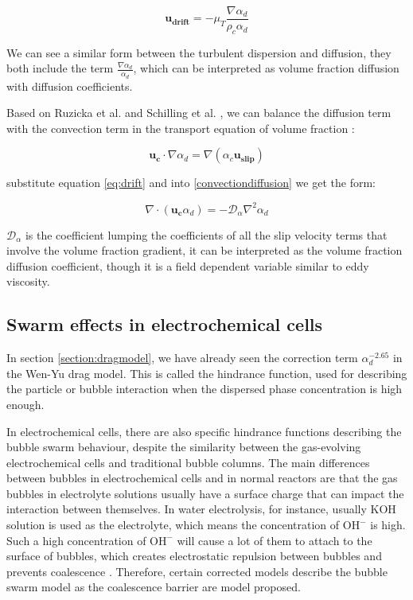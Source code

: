 \begin{equation}\label{eq:drift}
    \mathbf{u_{drift}} = -\mu_T \frac{\nabla \alpha_d}{\rho_c \alpha_d}
\end{equation}

We can see a similar form between the turbulent dispersion and diffusion, they both include the term $\frac{\nabla \alpha_d}{\alpha_d}$, which can be interpreted as volume fraction diffusion with diffusion coefficients.

Based on Ruzicka et al. \cite{Ruzicka2003} and Schilling et al. \cite{Schillings2015}, we can balance the diffusion term with the convection term in the transport equation of volume fraction \cite{Schillings2015}: 

\begin{equation}\label{convectiondiffusion}
     \mathbf{u_c} \cdot \nabla \alpha_d = \nabla(\alpha_c \mathbf{u_{slip}})
\end{equation}

substitute equation \ref{eq:drift} and \label{eq:diffusion} into \ref{convectiondiffusion} we get the form:

\begin{equation}
    \nabla \cdot (\mathbf{u_c} \alpha_d) = -\mathcal{D_{\alpha}} \nabla^2 \alpha_d 
\end{equation}

$\mathcal{D_{\alpha}}$ is the coefficient lumping the coefficients of all the slip velocity terms that involve the volume fraction gradient, it can be interpreted as the volume fraction diffusion coefficient, though it is a field dependent variable similar to eddy viscosity.


\subsection{Swarm effects in electrochemical cells}

In section \ref{section:dragmodel}, we have already seen the correction term $\alpha^{-2.65}_d$ in the Wen-Yu drag model. This is called the hindrance function, used for describing the particle or bubble interaction when the dispersed phase concentration is high enough.

In electrochemical cells, there are also specific hindrance functions describing the bubble swarm behaviour, despite the similarity between the gas-evolving electrochemical cells and traditional bubble columns. The main differences between bubbles in electrochemical cells and in normal reactors are that the gas bubbles in electrolyte solutions usually have a surface charge that can impact the interaction between themselves. In water electrolysis, for instance, usually $\mathrm{KOH}$ solution is used as the electrolyte, which means the concentration of $\mathrm{OH^-}$ is high. Such a high concentration of $\mathrm{OH^-}$ will cause a lot of them to attach to the surface of bubbles, which creates electrostatic repulsion between bubbles and prevents coalescence \cite{Kreysa1985}. Therefore, certain corrected models describe the bubble swarm model as the coalescence barrier are model proposed.

